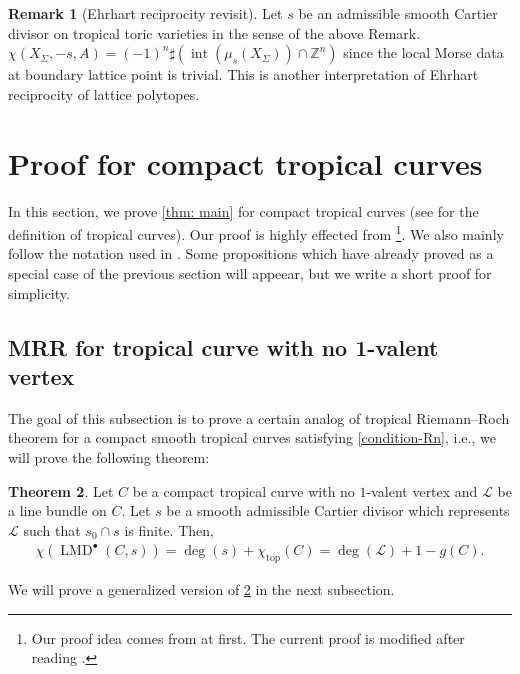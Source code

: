 \documentclass[a4paper,dvipdfmx,reqno,12pt]{amsart}
\theoremstyle{definition}
\newtheorem{theorem}{Theorem}[section]
\newtheorem{remark}[theorem]{Remark}
\newcommand{\Z}{\mathbb{Z}}%
\newcommand{\opn}[1]{\operatorname{#1}}
\numberwithin{equation}{section}
\begin{document}
\begin{remark}[{Ehrhart reciprocity revisit}]
Let $s$ be an admissible smooth Cartier divisor on 
tropical toric varieties in the sense of the above Remark.
$\chi(X_{\Sigma},-s,A)=(-1)^{n}\sharp (\opn{int}(\mu_s(X_{\Sigma}))\cap \Z^{n})$ since
the local Morse data at boundary lattice point is trivial.
This is another interpretation of Ehrhart reciprocity of 
lattice polytopes.
\end{remark}



\iffalse
From definition,
\begin{align}
df(x)\notin \opn{Lin}(S,x)^{\bot} 
\Rightleftarrows df|_{\opn{Lin}(S,x)}(x)\ne 0
\end{align}

Fix a polyhedral fan structure $\mathscr{P}$ of 
$S/\opn{Lin}(S,x)$. The pullback induced from
$\opn{pr}\colon S\to S/\opn{Lin}(S,x)$ induces 
a fan structure on
$\bigcup_{x\in sigma \in \mathscr{P}}\sigma=
\opn{Lin}(S,x)$.

\fi





\section{Proof for compact tropical curves}
In this section, we prove \cref{thm: main} for 
compact tropical curves
(see \cite[Definition 3.1]{mikhalkinTropicalCurvesTheir2008a} 
for the definition of tropical curves).
Our proof is highly effected from 
\cite{knill2012graph,MR2676658,auroux2022lagrangian}
\footnote{Our proof idea comes from 
\cite{knill2012graph,MR2676658} at first.  
The current proof is modified after reading 
\cite{auroux2022lagrangian}.}.
We also mainly follow the notation used in 
\cite{auroux2022lagrangian}.
Some propositions which have already proved as a special case
of the previous section will appeear, but we write a short proof 
for simplicity.

\subsection{MRR for tropical curve with no 1-valent
vertex}

The goal of this subsection is to prove a certain 
analog of tropical Riemann--Roch theorem for
a compact smooth tropical 
curves satisfying \cref{condition-Rn}, i.e., 
we will prove
the following theorem:
\begin{theorem}
\label{theorem-MRR-metric-graph}
Let $C$ be a compact tropical curve with 
no $1$-valent vertex and 
$\mathcal{L}$ be a line bundle on $C$.
Let $s$ be a smooth admissible Cartier divisor which
represents $\mathcal{L}$ such that 
$s_0\cap s$ is finite. Then,
\begin{align}
  \chi(\opn{LMD}^{\bullet}(C,s))=\opn{deg}(s)+
\chi_{\opn{top}}(C)=\opn{deg}(\mathcal{L})+1-g(C).
\end{align}
\end{theorem}
We will prove a generalized version of 
\cref{theorem-MRR-metric-graph} in the next subsection.
\end{document}
